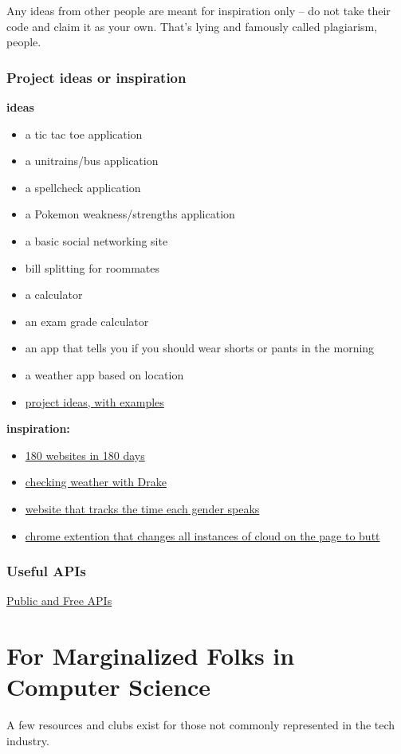 \documentclass{article}
\begin{document}
Any ideas from other people are meant for inspiration only -- do not take their
code and claim it as your own. That's lying and famously called plagiarism,
people.
\subsubsection{Project ideas or inspiration}
\textbf{ideas}
\begin{itemize}
    \item a tic tac toe application
    \item a unitrains/bus application
    \item a spellcheck application
    \item a Pokemon weakness/strengths application
    \item a basic social networking site
    \item bill splitting for roommates
    \item a calculator
    \item an exam grade calculator 
    \item an app that tells you if you should wear shorts or pants in the morning
    \item a weather app based on location
    \item \href{https://github.com/karan/Projects}{project ideas, with examples}
\end{itemize}
\textbf{inspiration:}
\begin{itemize}
    \item \href{https://jenniferdewalt.com/}{180 websites in 180 days}
    \item \href{http://drakeweather.com/}{checking weather with Drake}
    \item \href{https://github.com/cathydeng/are-men-talking-too-much}{website that tracks the time each gender speaks}
    \item \href{https://github.com/panicsteve/cloud-to-butt}{chrome extention that changes all instances of cloud on the page to butt}
\end{itemize}
\subsubsection{Useful APIs}
\href{https://github.com/toddmotto/public-apis}{Public and Free APIs}
\newpage
\section {For Marginalized Folks in Computer Science}
A few resources and clubs exist for those not commonly represented in the tech
industry.
\end{document}
